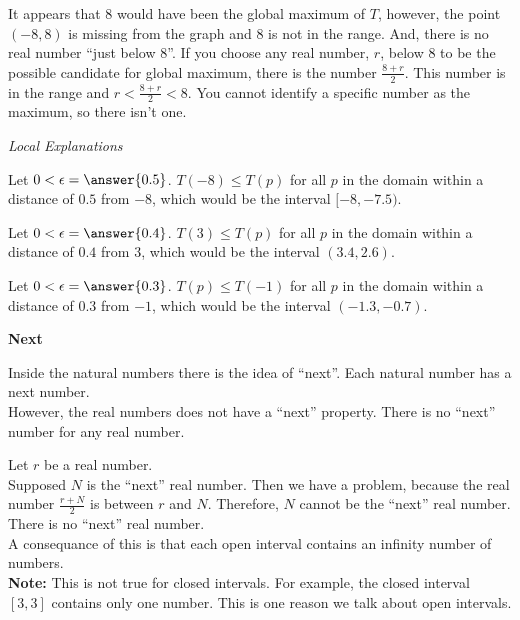 \documentclass{ximera}
\begin{document}
It appears that $8$ would have been the global maximum of $T$, however, the point $(-8, 8)$ is missing from the graph and $8$ is not in the range.  And, there is no real number ``just below $8$''.  If you choose any real number, $r$, below $8$ to be the possible candidate for global maximum, there is the number $\frac{8+r}{2}$. This number is in the range and $r < \frac{8+r}{2} < 8$.  You cannot identify a specific number as the maximum, so there isn't one.








\begin{explanation} \textit{Local Explanations}


Let $0 < \epsilon = \answer{0.5}$.  $T(-8) \leq T(p)$ for all $p$ in the domain within a distance of $0.5$ from $-8$, which would be the interval $[-8, -7.5)$.

Let $0 < \epsilon = \answer{0.4}$.  $T(3) \leq T(p)$ for all $p$ in the domain within a distance of $0.4$ from $3$, which would be the interval $(3.4, 2.6)$.

Let $0 < \epsilon = \answer{0.3}$.  $T(p) \leq T(-1)$ for all $p$ in the domain within a distance of $0.3$ from $-1$, which would be the interval $(-1.3, -0.7)$.

\end{explanation}





\begin{idea} \textbf{Next}


Inside the natural numbers there is the idea of ``next''.  Each natural number has a next number. \\


However, the real numbers does not have a ``next'' property.  There is no ``next'' number for any real number.


Let $r$ be a real number. \\

Supposed $N$ is the ``next'' real number.  Then we have a problem, because the real number $\frac{r+N}{2}$ is between $r$ and $N$.  Therefore, $N$ cannot be the ``next'' real number.  There is no ``next'' real number. \\


A consequance of this is that each open interval contains an infinity number of numbers. \\



\textbf{Note: } This is not true for closed intervals.  For example, the closed interval $[3, 3]$ contains only one number.  This is one reason we talk about open intervals.



\end{idea}
\end{document}
